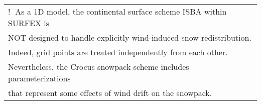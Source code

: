 {\bf{
			\begin{center}
			\begin{tabular}{|l|}
\hline
 \textcircled{!} As a 1D model, the continental surface scheme ISBA within SURFEX is \\
 NOT designed to handle explicitly wind-induced snow redistribution. \\
 Indeed, grid points are treated independently from each other. \\
 Nevertheless, the Crocus snowpack scheme includes parameterizations \\
 that represent some effects of wind drift on the snowpack.  \\
\hline
			\end{tabular}
			\end{center}

}}

